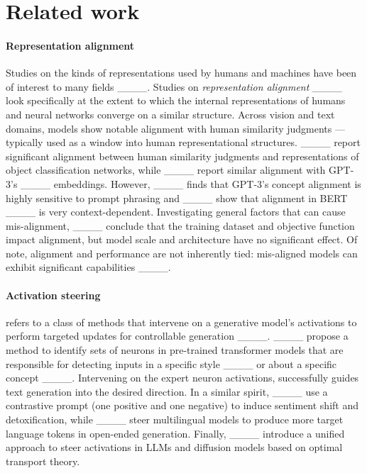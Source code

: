 \section{Related work}
\paragraph{Representation alignment}

Studies on the kinds of representations used by humans and machines have been of interest to many fields ____. Studies on \textit{representation alignment} ____ look specifically at the extent to which the internal representations of humans and neural networks converge on a similar structure. 
Across vision and text domains, models show notable alignment with human similarity judgments ---typically used as a window into human representational structures. ____ report significant alignment between human similarity judgments and representations of object classification networks, while ____ report similar alignment with GPT-3’s ____ embeddings. However, ____ finds that GPT-3's concept alignment is highly sensitive to prompt phrasing and
____ show that alignment in BERT ____ is very context-dependent.  Investigating general factors that can cause mis-alignment, %
____ conclude that the training dataset and objective function impact alignment, but model scale and architecture have no significant effect. Of note, alignment and performance are not inherently tied: mis-aligned models can exhibit significant capabilities ____. %


 



\paragraph{Activation steering} refers to a class of methods that intervene on a generative model's activations to perform targeted updates for controllable generation ____. ____ propose a method to identify sets of neurons in pre-trained transformer models that are responsible for detecting inputs in a specific style ____ or about a specific concept ____. Intervening on the expert neuron activations, %
successfully guides text generation into the desired direction. In a similar spirit, ____ use a contrastive prompt (one positive and one negative) to induce sentiment shift and detoxification, while
____ steer multilingual models to produce more target language tokens in open-ended generation. Finally, ____ introduce a unified approach to steer activations in LLMs and diffusion models based on optimal transport theory.